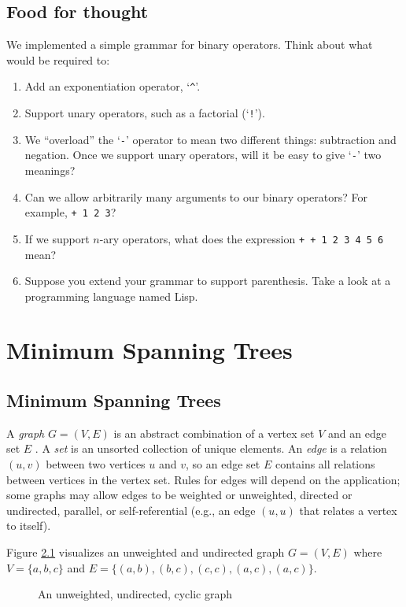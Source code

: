 \documentclass{book}
\begin{document}
\section{Food for thought}
We implemented a simple grammar for binary operators. Think about what would be required to:

\begin{enumerate}
\item Add an exponentiation operator, `\texttt{\^}'.
\item Support unary operators, such as a factorial (`\texttt{!}').
\item We ``overload'' the `\texttt{-}' operator to mean two different things: subtraction and negation. Once we support unary operators, will it be easy to give `\texttt{-}' two meanings?
\item Can we allow arbitrarily many arguments to our binary operators? For example, \texttt{+ 1 2 3}?
\item If we support $n$-ary operators, what does the expression \texttt{+ + 1 2 3 4 5 6} mean?
\item Suppose you extend your grammar to support parenthesis. Take a look at a programming language named Lisp.
\end{enumerate}

\chapter{Minimum Spanning Trees}

\section{Minimum Spanning Trees}

A \textit{graph} $G=(V,E)$ is an abstract combination of a vertex set $V$ and an edge set $E$ \cite{rosen2003discrete}. A \textit{set} is an unsorted collection of unique elements. An \textit{edge} is a relation $(u,v)$ between two vertices $u$ and $v$, so an edge set $E$ contains all relations between vertices in the vertex set. Rules for edges will depend on the application; some graphs may allow edges to be weighted or unweighted, directed or undirected, parallel, or self-referential (e.g., an edge $(u,u)$ that relates a vertex to itself).

Figure \ref{spannABC} visualizes an unweighted and undirected graph $G=(V,E)$ where $V=\{a,b,c\}$ and $E=\{(a,b), (b,c), (c,c), (a,c), (a,c)\}$.

\begin{figure}[ht]
\centering
{}
\caption{An unweighted, undirected, cyclic graph}
\label{spannABC}
\end{figure}
\end{document}
